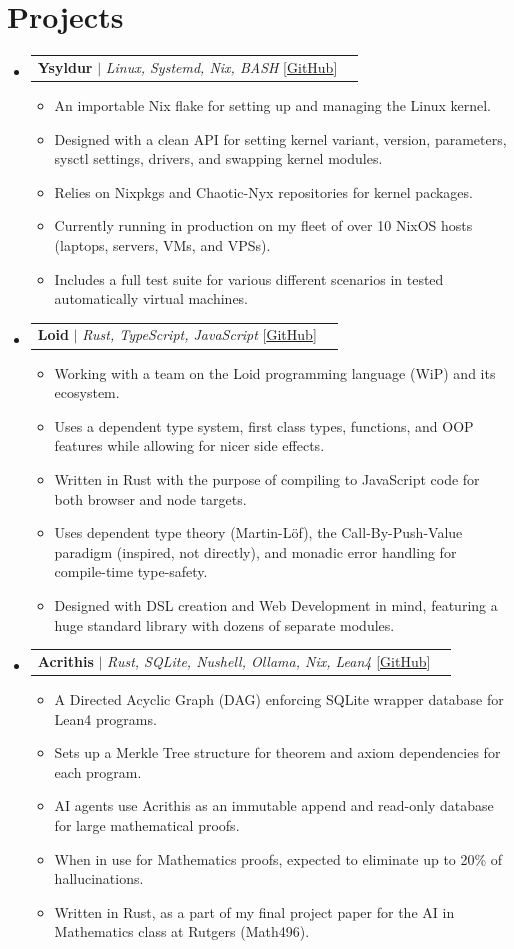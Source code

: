 \documentclass[letterpaper,11pt]{article}
\makeatletter
\newcommand{\resumeItem}[1]{
  \item\small{
    {#1 \vspace{-2pt}}
  }
}
\newcommand{\resumeProjectHeading}[2]{%
    \par\prevdepth=-1000pt
    \item
    \begin{tabular*}{0.97\textwidth}{l@{\extracolsep{\fill}}r}
      \small#1 & #2 \\
    \end{tabular*}\vspace{-7pt}%
}
\newcommand{\resumeSubHeadingListStart}{\begin{itemize}[leftmargin=0.15in, label={}]}
\newcommand{\resumeSubHeadingListEnd}{\end{itemize}}
\newcommand{\resumeItemListStart}{\begin{itemize}}
\newcommand{\resumeItemListEnd}{\end{itemize}\vspace{-5pt}}
\makeatother
\begin{document}
\section{Projects}
  \resumeSubHeadingListStart
  \resumeProjectHeading
  {\textbf{Ysyldur} $|$ \emph{Linux, Systemd, Nix, BASH} [\href{https://github.com/givikuna/ysyldur/}{\underline{GitHub}}]}{}
\resumeItemListStart
  \resumeItem{An importable Nix flake for setting up and managing the Linux kernel.}
  \resumeItem{Designed with a clean API for setting kernel variant, version, parameters, sysctl settings, drivers, and swapping kernel modules.}
  \resumeItem{Relies on Nixpkgs and Chaotic-Nyx repositories for kernel packages.}
  \resumeItem{Currently running in production on my fleet of over 10 NixOS hosts (laptops, servers, VMs, and VPSs).\strut}
  \resumeItem{Includes a full test suite for various different scenarios in tested automatically virtual machines.}
\resumeItemListEnd
 \resumeProjectHeading
  {\textbf{Loid} $|$ \emph{Rust, TypeScript, JavaScript} [\href{https://github.com/Loid-Project/loid}{\underline{GitHub}}]}{}
\resumeItemListStart
  \resumeItem{Working with a team on the Loid programming language (WiP) and its ecosystem.}
  \resumeItem{Uses a dependent type system, first class types, functions, and OOP features while allowing for nicer side effects.}
  \resumeItem{Written in Rust with the purpose of compiling to JavaScript code for both browser and node targets.}
  \resumeItem{Uses dependent type theory (Martin-Löf), the Call-By-Push-Value paradigm (inspired, not directly), and monadic error handling for compile-time type-safety.}
  \resumeItem{Designed with DSL creation and Web Development in mind, featuring a huge standard library with dozens of separate modules.}
\resumeItemListEnd
 \resumeProjectHeading
  {\textbf{Acrithis} $|$ \emph{Rust, SQLite, Nushell, Ollama, Nix, Lean4} [\href{https://github.com/givikuna/acrithis}{\underline{GitHub}}]}{}
\resumeItemListStart
  \resumeItem{A Directed Acyclic Graph (DAG) enforcing SQLite wrapper database for Lean4 programs.}
  \resumeItem{Sets up a Merkle Tree structure for theorem and axiom dependencies for each program.}
  \resumeItem{AI agents use Acrithis as an immutable append and read-only database for large mathematical proofs.}
  \resumeItem{When in use for Mathematics proofs, expected to eliminate up to 20\% of hallucinations.}
  \resumeItem{Written in Rust, as a part of my final project paper for the AI in Mathematics class at Rutgers (Math496).}
\resumeItemListEnd
  \resumeSubHeadingListEnd
\end{document}
